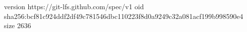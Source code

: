 version https://git-lfs.github.com/spec/v1
oid sha256:bcf81c924ddf2df49c781546dbc110223f8d0a9249c32a081acf199b998590e4
size 2636
